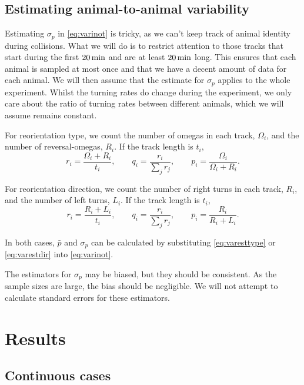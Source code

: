 \documentclass[12pt]{article}
\begin{document}
\subsection{Estimating animal-to-animal variability}\label{sec:variest}

Estimating $\sigma_p$ in \eqref{eq:varinot} is tricky, as we can't keep track of animal identity during collisions. What we will do is to restrict attention to those tracks that start during the first $20\,\mathrm{min}$ and are at least $20\,\mathrm{min}$ long. This ensures that each animal is sampled at most once and that we have a decent amount of data for each animal. We will then assume that the estimate for $\sigma_p$ applies to the whole experiment. Whilst the turning rates do change during the experiment, we only care about the ratio of turning rates between different animals, which we will assume remains constant.

For reorientation type, we count the number of omegas in each track, $\Omega_i$, and the number of reversal-omegas, $R_i$. If the track length is $t_i$,
%
\begin{equation}\label{eq:varesttype}
  r_i = \frac{\Omega_i+R_i}{t_i}, \qquad
  q_i = \frac{r_i}{\sum_j r_j}, \qquad
  p_i = \frac{\Omega_i}{\Omega_i+R_i}.
\end{equation}
%

For reorientation direction, we count the number of right turns in each track, $R_i$, and the number of left turns, $L_i$. If the track length is $t_i$,
%
\begin{equation}\label{eq:varestdir}
  r_i = \frac{R_i+L_i}{t_i}, \qquad
  q_i = \frac{r_i}{\sum_j r_j}, \qquad
  p_i = \frac{R_i}{R_i+L_i}.
\end{equation}
%

In both cases, $\bar{p}$ and $\sigma_p$ can be calculated by substituting \eqref{eq:varesttype} or \eqref{eq:varestdir} into \eqref{eq:varinot}.

The estimators for $\sigma_p$ may be biased, but they should be consistent. As the sample sizes are large, the bias should be negligible. We will not attempt to calculate standard errors for these estimators.



\section{Results}\label{sec:results}

\subsection{Continuous cases}\label{sec:ctsresults}
\end{document}

